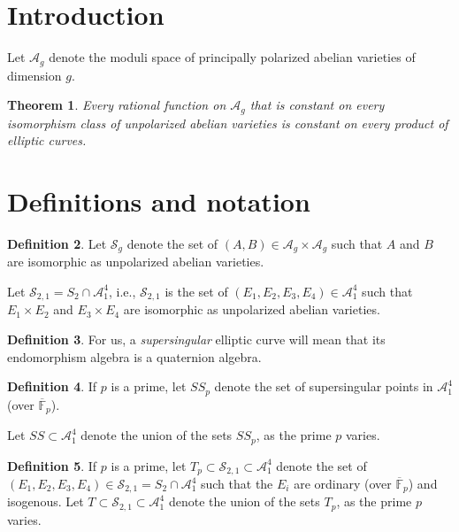 \documentclass{amsart}
\date{June 14, 2019}
\title
[]
{}
\def\F{\mathbb{F}}
\def\SS{{\mathcal S}}
\def\AA{{\mathcal A}}
\def\F{{\mathbb F}}
\numberwithin{equation}{section}
\newtheorem{thm}{Theorem}[section]
\theoremstyle{definition}
\newtheorem{defn}[thm]{Definition}
\begin{document}



\maketitle

\section{Introduction}

Let $\AA_g$ denote the moduli space of principally polarized abelian varieties of dimension $g$. 

\begin{thm}
\label{mainthm}
Every rational function on $\AA_g$ that is constant on every isomorphism class of unpolarized abelian varieties is constant on every product of elliptic curves.
\end{thm}


\section{Definitions and notation}

\begin{defn}
Let $\SS_g$ denote the set of $(A,B) \in \AA_g \times \AA_g$ such that $A$ and $B$ are isomorphic as unpolarized abelian varieties.



Let $\SS_{2,1} = S_2 \cap \AA_1^4$, i.e., $\SS_{2,1}$ is the set of $(E_1,E_2,E_3,E_4) \in \AA_1^4$ such that $E_1\times E_2$ and $E_3\times E_4$ are isomorphic as unpolarized abelian varieties.
\end{defn}

\begin{defn}
For us, a {\em supersingular} elliptic curve will mean that its endomorphism algebra is a quaternion algebra.
\end{defn}

\begin{defn}
If $p$ is a prime, let $SS_p$ denote the set of supersingular points in $\AA_1^4$ (over $\overline{\F}_p$).

Let $SS \subset \AA_1^4$ denote the union of the sets $SS_p$, as the prime $p$ varies.
\end{defn}

\begin{defn}
If $p$ is a prime, let $T_p \subset \SS_{2,1} \subset \AA_1^4$ denote the set of $(E_1,E_2,E_3,E_4) \in \SS_{2,1} = S_2 \cap \AA_1^4$ such that the $E_i$ are ordinary (over $\overline{\F}_p$) and isogenous.
Let $T \subset \SS_{2,1} \subset \AA_1^4$ denote the union of the sets $T_p$, as the prime $p$ varies.

\end{defn}
\end{document}
